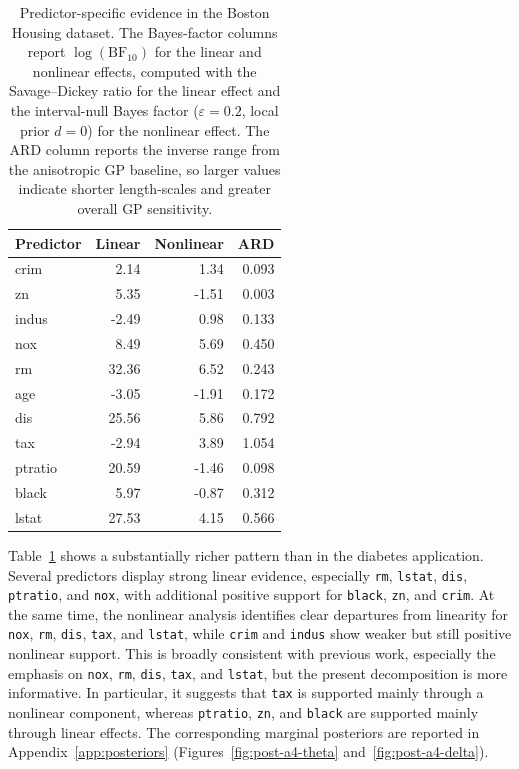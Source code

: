 \documentclass{article}
\begin{document}
\begin{table}[t]
  \centering
  \caption{Predictor-specific evidence in the Boston Housing dataset. The Bayes-factor columns report $\log(\mathrm{BF}_{10})$ for the linear and nonlinear effects, computed with the Savage--Dickey ratio for the linear effect and the interval-null Bayes factor ($\varepsilon=0.2$, local prior $d=0$) for the nonlinear effect. The ARD column reports the inverse range from the anisotropic GP baseline, so larger values indicate shorter length-scales and greater overall GP sensitivity.}
  \label{tab:boston_bf_ard}
  \small
  \begin{tabular}{lrrr}
    \toprule
    Predictor & Linear & Nonlinear & ARD \\
    \midrule
    crim    & 2.14  & 1.34  & 0.093 \\
    zn      & 5.35  & -1.51 & 0.003 \\
    indus   & -2.49 & 0.98  & 0.133 \\
    nox     & 8.49  & 5.69  & 0.450 \\
    rm      & 32.36 & 6.52  & 0.243 \\
    age     & -3.05 & -1.91 & 0.172 \\
    dis     & 25.56 & 5.86  & 0.792 \\
    tax     & -2.94 & 3.89  & 1.054 \\
    ptratio & 20.59 & -1.46 & 0.098 \\
    black   & 5.97  & -0.87 & 0.312 \\
    lstat   & 27.53 & 4.15  & 0.566 \\
    \bottomrule
  \end{tabular}
\end{table}

Table~\ref{tab:boston_bf_ard} shows a substantially richer pattern than in the diabetes application. Several predictors display strong linear evidence, especially \texttt{rm}, \texttt{lstat}, \texttt{dis}, \texttt{ptratio}, and \texttt{nox}, with additional positive support for \texttt{black}, \texttt{zn}, and \texttt{crim}. At the same time, the nonlinear analysis identifies clear departures from linearity for \texttt{nox}, \texttt{rm}, \texttt{dis}, \texttt{tax}, and \texttt{lstat}, while \texttt{crim} and \texttt{indus} show weaker but still positive nonlinear support. This is broadly consistent with previous work, especially the emphasis on \texttt{nox}, \texttt{rm}, \texttt{dis}, \texttt{tax}, and \texttt{lstat}, but the present decomposition is more informative. In particular, it suggests that \texttt{tax} is supported mainly through a nonlinear component, whereas \texttt{ptratio}, \texttt{zn}, and \texttt{black} are supported mainly through linear effects. The corresponding marginal posteriors are reported in Appendix~\ref{app:posteriors} (Figures~\ref{fig:post-a4-theta} and~\ref{fig:post-a4-delta}).
\end{document}
